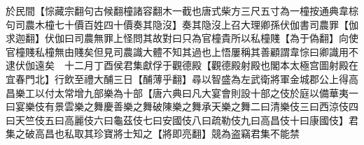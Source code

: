 於民間【悰藏宗翻句古候翻橦諸容翻木一截也唐式柴方三尺五寸為一橦按通典韋棕句司農木橦七十價百姓四十價奏其隐沒】奏其隐沒上召大理卿孫伏伽書司農罪【伽求迦翻】伏伽曰司農無罪上怪問其故對曰只為官橦貴所以私橦賤【為于偽翻】向使官橦賤私橦無由賤矣但見司農識大體不知其過也上悟屢稱其善顧謂韋悰曰卿識用不逮伏伽遠矣　十二月丁酉侯君集獻俘于觀德殿【觀德殿射殿也閣本太極宫圖射殿在宜春門北】行飲至禮大酺三日【酺薄乎翻】尋以智盛為左武衛將軍金城郡公上得高昌樂工以付太常增九部樂為十部【唐六典曰凡大宴會則設十部之伎於庭以備華夷一曰宴樂伎有景雲樂之舞慶善樂之舞破陳樂之舞承天樂之舞二曰清樂伎三曰西涼伎四曰天竺伎五曰高麗伎六曰龜茲伎七曰安國伎八曰疏勒伎九曰高昌伎十曰康國伎】君集之破高昌也私取其珍寶將士知之【將即亮翻】競為盗竊君集不能禁